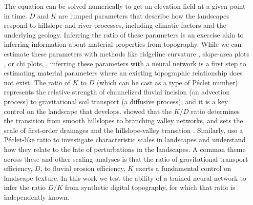 \documentclass[draft]{agujournal2019}
\begin{document}
The equation can be solved numerically to get an elevation field at a given point in time.
\(D\) and \(K\) are lumped parameters that describe how the landscapes respond to hillslope and river processes, including climatic factors and the underlying geology.  Inferring the ratio of these parameters is an exercise akin to inferring information about material properties from topography.  While we can estimate these parameters with methods like ridgeline curvature \cite{roeringEvidenceNonlinearDiffusive1999}, slope-area plots \cite{wobusTectonicsTopographyProcedures2006}, or chi plots, \cite{perronIntegralApproachBedrock2013}, inferring these parameters with a neural network is a first step to estimating material parameters where an existing topographic relationship does not exist.   
The ratio of \(K\) to \(D\) (which can be cast as a type of Péclet number) represents the relative strength of channelized fluvial incision (an advection process) to gravitational soil transport (a diffusive process), and it is a key control on the landscape that develops.   showed that the \(K/D\) ratio determines the transition from smooth hillslopes to branching valley networks, and sets the scale of first-order drainages and the hillslope-valley  transition .   Similarly, \cite{theodoratosScalingSimilarityStreampower2018} use a Péclet-like ratio to investigate characteristic scales in landscapes and understand how they relate to the fate of perturbations in the landscapes.  A common theme across these and other scaling analyses is that the ratio of gravitational transport efficiency, \(D\), to fluvial erosion efficiency, \(K\) exerts a fundamental control on landscape texture.  In this work we test the ability of a trained neural network to infer the ratio \(D/K\) from synthetic digital topography, for which that ratio is independently known.
\end{document}
